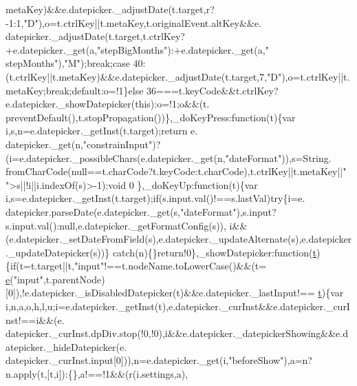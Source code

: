 \begin{DoxyCode}
      metaKey)&&e.datepicker.\_adjustDate(t.target,r?-1:1,\textcolor{stringliteral}{"D"}),o=t.ctrlKey||t.metaKey,t.originalEvent.altKey&&e.
      datepicker.\_adjustDate(t.target,t.ctrlKey?+e.datepicker.\_get(a,\textcolor{stringliteral}{"stepBigMonths"}):+e.datepicker.\_get(a,\textcolor{stringliteral}{"
      stepMonths"}),\textcolor{stringliteral}{"M"});\textcolor{keywordflow}{break};\textcolor{keywordflow}{case} 40:(t.ctrlKey||t.metaKey)&&e.datepicker.\_adjustDate(t.target,7,\textcolor{stringliteral}{"D"}),o=t.ctrlKey||t.
      metaKey;\textcolor{keywordflow}{break};\textcolor{keywordflow}{default}:o=!1\}\textcolor{keywordflow}{else} 36===t.keyCode&&t.ctrlKey?e.datepicker.\_showDatepicker(\textcolor{keyword}{this}):o=!1;o&&(t.
      preventDefault(),t.stopPropagation())\},\_doKeyPress:\textcolor{keyword}{function}(t)\{var i,s,n=e.datepicker.\_getInst(t.target);\textcolor{keywordflow}{return} e.
      datepicker.\_get(n,\textcolor{stringliteral}{"constrainInput"})?(i=e.datepicker.\_possibleChars(e.datepicker.\_get(n,\textcolor{stringliteral}{"dateFormat"})),s=String.
      fromCharCode(null==t.charCode?t.keyCode:t.charCode),t.ctrlKey||t.metaKey||\textcolor{stringliteral}{" "}>s||!i||i.indexOf(s)>-1):\textcolor{keywordtype}{void} 0
      \},\_doKeyUp:\textcolor{keyword}{function}(t)\{var i,s=e.datepicker.\_getInst(t.target);\textcolor{keywordflow}{if}(s.input.val()!==s.lastVal)\textcolor{keywordflow}{try}\{i=e.
      datepicker.parseDate(e.datepicker.\_get(s,\textcolor{stringliteral}{"dateFormat"}),s.input?s.input.val():null,e.datepicker.\_getFormatConfig(s)),
      i&&(e.datepicker.\_setDateFromField(s),e.datepicker.\_updateAlternate(s),e.datepicker.\_updateDatepicker(s))\}\textcolor{keywordflow}{
      catch}(n)\{\}\textcolor{keywordflow}{return}!0\},\_showDatepicker:\textcolor{keyword}{function}(\hyperlink{jquery-2_80_83_8min_8js_aaccc9105df5383111407fd5b41255e23}{t})\{\textcolor{keywordflow}{if}(t=t.target||t,\textcolor{stringliteral}{"input"}!==t.nodeName.toLowerCase()&&(t=
      \hyperlink{jquery-ui_8min_8js_a2c038346d47955cbe2cb91e338edd7e1}{e}(\textcolor{stringliteral}{"input"},t.parentNode)[0]),!e.datepicker.\_isDisabledDatepicker(t)&&e.datepicker.\_lastInput!==
      \hyperlink{jquery-2_80_83_8min_8js_aaccc9105df5383111407fd5b41255e23}{t})\{var i,n,a,o,h,l,u;i=e.datepicker.\_getInst(t),e.datepicker.\_curInst&&e.datepicker.\_curInst!==i&&(e.
      datepicker.\_curInst.dpDiv.stop(!0,!0),i&&e.datepicker.\_datepickerShowing&&e.datepicker.\_hideDatepicker(e.
      datepicker.\_curInst.input[0])),n=e.datepicker.\_get(i,\textcolor{stringliteral}{"beforeShow"}),a=n?n.apply(t,[t,i]):\{\},a!==!1&&(r(i.settings,a),

\end{DoxyCode}
